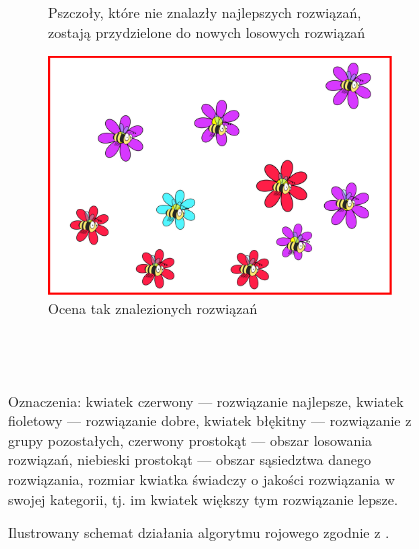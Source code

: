 \begin{figure} [htbp]
\begin{subfigure}[b]{0.32\textwidth}
    \caption{Pszczoły, które nie znalazły najlepszych rozwiązań, zostają przydzielone do nowych losowych rozwiązań}
    \end{subfigure}
    \begin{subfigure}[b]{0.32\textwidth}
    \includegraphics[width=\linewidth]{figures/rojowe/etap9.png}
    \caption{Ocena tak znalezionych rozwiązań\\~\\~\\~}
    \end{subfigure}
    \caption[Ilustrowany schemat działania algorytmu rojowego]{Ilustrowany schemat działania algorytmu rojowego zgodnie z \cite{algroj}.} 
    Oznaczenia: kwiatek czerwony --- rozwiązanie najlepsze, kwiatek fioletowy --- rozwiązanie dobre, kwiatek błękitny --- rozwiązanie z grupy pozostałych, czerwony prostokąt --- obszar losowania rozwiązań, niebieski prostokąt --- obszar sąsiedztwa danego rozwiązania, rozmiar kwiatka świadczy o jakości rozwiązania w swojej kategorii, tj. im kwiatek większy tym rozwiązanie lepsze.
    \label{fig:schemat_roj}
\end{figure}

